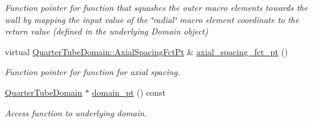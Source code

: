 \begin{DoxyCompactItemize}
\begin{DoxyCompactList}\small\item\em Function pointer for function that squashes the outer macro elements towards the wall by mapping the input value of the \char`\"{}radial\char`\"{} macro element coordinate to the return value (defined in the underlying Domain object) \end{DoxyCompactList}\item 
virtual \hyperlink{classoomph_1_1QuarterTubeDomain_ae347af42a5dcb9b3b82c2247975b01db}{Quarter\+Tube\+Domain\+::\+Axial\+Spacing\+Fct\+Pt} \& \hyperlink{classoomph_1_1QuarterTubeMesh_a5c880d6214a07676a533227f813634d8}{axial\+\_\+spacing\+\_\+fct\+\_\+pt} ()
\begin{DoxyCompactList}\small\item\em Function pointer for function for axial spacing. \end{DoxyCompactList}\item 
\hyperlink{classoomph_1_1QuarterTubeDomain}{Quarter\+Tube\+Domain} $\ast$ \hyperlink{classoomph_1_1QuarterTubeMesh_a351b2060f43c881d7bda9b7ef4a1c32e}{domain\+\_\+pt} () const
\begin{DoxyCompactList}\small\item\em Access function to underlying domain. \end{DoxyCompactList}\end{DoxyCompactItemize}
